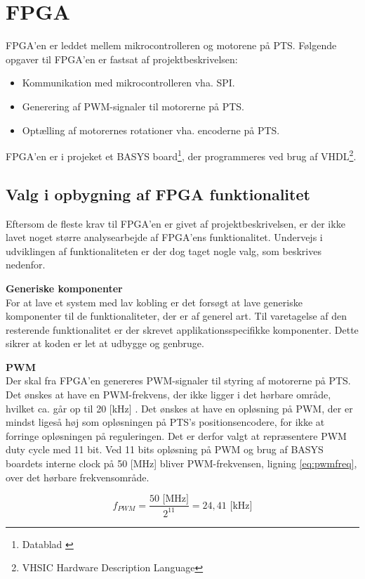 \section{FPGA}
\label{sec:FPGA}
FPGA'en er leddet mellem mikrocontrolleren og motorene på PTS.
Følgende opgaver til FPGA'en er fastsat af projektbeskrivelsen:

\begin{itemize}
\itemsep1pt
	\item Kommunikation med mikrocontrolleren vha. SPI.
	\item Generering af PWM-signaler til motorerne på PTS.
	\item Optælling af motorernes rotationer vha. encoderne på PTS.
\end{itemize}
FPGA'en er i projeket et BASYS board\footnote{Datablad \citep{basys2}}, der programmeres ved brug af VHDL\footnote{VHSIC Hardware Description Language}.

\subsection{Valg i opbygning af FPGA funktionalitet}
Eftersom de fleste krav til FPGA'en er givet af projektbeskrivelsen, er der ikke 
lavet noget større analysearbejde af FPGA'ens funktionalitet. Undervejs i 
udviklingen af funktionaliteten er der dog taget nogle valg, som beskrives nedenfor.

\textbf{Generiske komponenter}\\
For at lave et system med lav kobling er det forsøgt at lave 
generiske komponenter til de funktionaliteter, der er af generel art. 
Til varetagelse af den resterende funktionalitet er der skrevet applikationsspecifikke 
komponenter.
Dette sikrer at koden er let at udbygge og genbruge.

\textbf{PWM}\\
Der skal fra FPGA'en genereres PWM-signaler til styring af motorerne på PTS.
Det ønskes at have en PWM-frekvens, der ikke ligger i det hørbare område, hvilket ca. går op til 20 [kHz] \citep{Hearingrange}. 
Det ønskes at have en opløsning på PWM, der er mindst ligeså høj som 
opløsningen på PTS's positionsencodere, for ikke at forringe opløsningen på reguleringen. 
Det er derfor valgt at repræsentere PWM duty cycle med 11 bit. 
Ved 11 bits opløsning på PWM og brug af BASYS boardets interne clock på 50 [MHz] bliver PWM-frekvensen,
ligning \ref{eq:pwmfreq}, over det hørbare frekvensområde.

\begin{equation}
  f_{PWM}=\frac{50 \text{ [MHz]}}{2^{11}} = 24,41 \text{ [kHz]}
	\label{eq:pwmfreq}
\end{equation}

